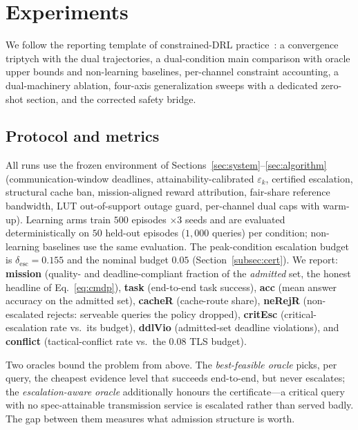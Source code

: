 \section{Experiments}\label{sec:experiments}

We follow the reporting template of constrained-DRL
practice~\cite{khairy2021constrained,long2025lyahippo}: a convergence
triptych with the dual trajectories, a dual-condition main comparison with
oracle upper bounds and non-learning baselines, per-channel constraint
accounting, a dual-machinery ablation, four-axis generalization sweeps
with a dedicated zero-shot section, and the corrected safety bridge.

\subsection{Protocol and metrics}\label{sub:protocol}
All runs use the frozen environment of
Sections~\ref{sec:system}--\ref{sec:algorithm} (communication-window
deadlines, attainability-calibrated $\varepsilon_k$, certified escalation,
structural cache ban, mission-aligned reward attribution, fair-share
reference bandwidth, LUT out-of-support outage guard, per-channel dual
caps with warm-up). Learning arms train $500$ episodes $\times3$ seeds and
are evaluated deterministically on $50$ held-out episodes ($1{,}000$
queries) per condition; non-learning baselines use the same evaluation.
The peak-condition escalation budget is
$\delta_{\mathrm{esc}}=0.155$ and the nominal budget $0.05$
(Section~\ref{subsec:cert}). We report: \textbf{mission} (quality- and
deadline-compliant fraction of the \emph{admitted} set, the honest
headline of Eq.~\eqref{eq:cmdp}), \textbf{task} (end-to-end task success),
\textbf{acc} (mean answer accuracy on the admitted set), \textbf{cacheR}
(cache-route share), \textbf{neRejR} (non-escalated rejects: serveable
queries the policy dropped), \textbf{critEsc} (critical-escalation rate
vs.\ its budget), \textbf{ddlVio} (admitted-set deadline violations), and
\textbf{conflict} (tactical-conflict rate vs.\ the $0.08$ TLS budget).

Two oracles bound the problem from above. The \emph{best-feasible oracle}
picks, per query, the cheapest evidence level that succeeds end-to-end,
but never escalates; the \emph{escalation-aware oracle} additionally
honours the certificate---a critical query with no spec-attainable
transmission service is escalated rather than served badly. The gap
between them measures what admission structure is worth.

